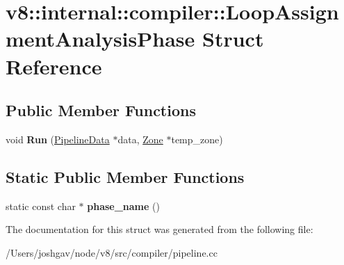 \hypertarget{structv8_1_1internal_1_1compiler_1_1_loop_assignment_analysis_phase}{}\section{v8\+:\+:internal\+:\+:compiler\+:\+:Loop\+Assignment\+Analysis\+Phase Struct Reference}
\label{structv8_1_1internal_1_1compiler_1_1_loop_assignment_analysis_phase}
\subsection*{Public Member Functions}
\begin{DoxyCompactItemize}
\item 
void {\bfseries Run} (\hyperlink{classv8_1_1internal_1_1compiler_1_1_pipeline_data}{Pipeline\+Data} $\ast$data, \hyperlink{classv8_1_1internal_1_1_zone}{Zone} $\ast$temp\+\_\+zone)\hypertarget{structv8_1_1internal_1_1compiler_1_1_loop_assignment_analysis_phase_a9982fe85f87626eaaa18d9eeab571940}{}\label{structv8_1_1internal_1_1compiler_1_1_loop_assignment_analysis_phase_a9982fe85f87626eaaa18d9eeab571940}

\end{DoxyCompactItemize}
\subsection*{Static Public Member Functions}
\begin{DoxyCompactItemize}
\item 
static const char $\ast$ {\bfseries phase\+\_\+name} ()\hypertarget{structv8_1_1internal_1_1compiler_1_1_loop_assignment_analysis_phase_ae60667fdb87710fdb7c22fdfcbfbe2ed}{}\label{structv8_1_1internal_1_1compiler_1_1_loop_assignment_analysis_phase_ae60667fdb87710fdb7c22fdfcbfbe2ed}

\end{DoxyCompactItemize}


The documentation for this struct was generated from the following file\+:\begin{DoxyCompactItemize}
\item 
/\+Users/joshgav/node/v8/src/compiler/pipeline.\+cc\end{DoxyCompactItemize}
